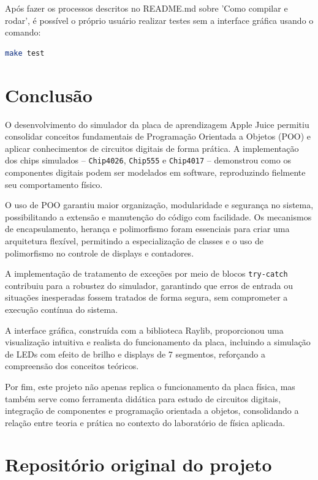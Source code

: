 \documentclass[12pt,a4paper]{article}
\begin{document}
Após fazer os processos descritos no README.md sobre 'Como compilar e rodar', é possível o próprio usuário realizar testes sem a interface gráfica usando o comando:
\begin{lstlisting}[language=bash]
make test
\end{lstlisting}   


\newpage
\section{Conclusão}

O desenvolvimento do simulador da placa de aprendizagem Apple Juice permitiu consolidar conceitos fundamentais de Programação Orientada a Objetos (POO) e aplicar conhecimentos de circuitos digitais de forma prática. A implementação dos chips simulados -- \texttt{Chip4026}, \texttt{Chip555} e \texttt{Chip4017} -- demonstrou como os componentes digitais podem ser modelados em software, reproduzindo fielmente seu comportamento físico.

O uso de POO garantiu maior organização, modularidade e segurança no sistema, possibilitando a extensão e manutenção do código com facilidade. Os mecanismos de encapsulamento, herança e polimorfismo foram essenciais para criar uma arquitetura flexível, permitindo a especialização de classes e o uso de polimorfismo no controle de displays e contadores.

A implementação de tratamento de exceções por meio de blocos \texttt{try-catch} contribuiu para a robustez do simulador, garantindo que erros de entrada ou situações inesperadas fossem tratados de forma segura, sem comprometer a execução contínua do sistema.

A interface gráfica, construída com a biblioteca Raylib, proporcionou uma visualização intuitiva e realista do funcionamento da placa, incluindo a simulação de LEDs com efeito de brilho e displays de 7 segmentos, reforçando a compreensão dos conceitos teóricos.

Por fim, este projeto não apenas replica o funcionamento da placa física, mas também serve como ferramenta didática para estudo de circuitos digitais, integração de componentes e programação orientada a objetos, consolidando a relação entre teoria e prática no contexto do laboratório de física aplicada.


\section{Repositório original do projeto}
\end{document}

